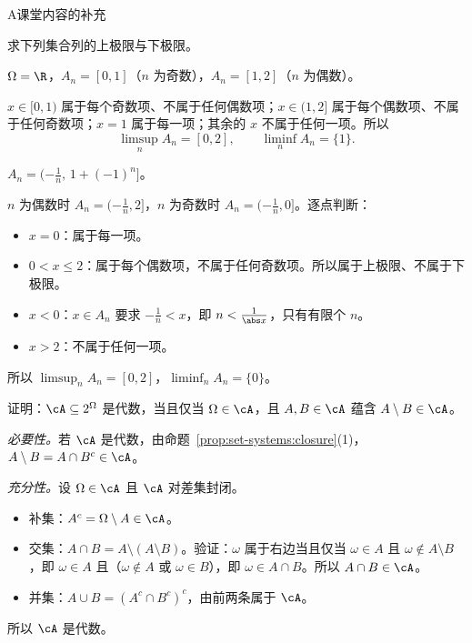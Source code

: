 \begin{exercises}{A}{课堂内容的补充}
\item\label{ex:set-systems:A2} 求下列集合列的上极限与下极限。
\begin{questions}
\item $\Omega=\R$，$A_n=[0,1]$（$n$ 为奇数），$A_n=[1,2]$（$n$ 为偶数）。
\begin{solution}
$x\in[0,1)$ 属于每个奇数项、不属于任何偶数项；$x\in(1,2]$ 属于每个偶数项、不属于任何奇数项；$x=1$ 属于每一项；其余的 $x$ 不属于任何一项。所以
\[
\limsup_nA_n=[0,2],\qquad\liminf_nA_n=\{1\}.
\]
\end{solution}
\item $A_n=(-\frac1n,\,1+(-1)^n]$。
\begin{solution}
$n$ 为偶数时 $A_n=(-\frac1n,2]$，$n$ 为奇数时 $A_n=(-\frac1n,0]$。逐点判断：
\begin{itemize}
\item $x=0$：属于每一项。
\item $0<x\leqslant2$：属于每个偶数项，不属于任何奇数项。所以属于上极限、不属于下极限。
\item $x<0$：$x\in A_n$ 要求 $-\frac1n<x$，即 $n<\frac1{\abs x}$，只有有限个 $n$。
\item $x>2$：不属于任何一项。
\end{itemize}
所以 $\limsup_nA_n=[0,2]$，$\liminf_nA_n=\{0\}$。
\end{solution}
\end{questions}

\item\label{ex:set-systems:A3} 证明：$\cA\subseteq2^\Omega$ 是代数，当且仅当 $\Omega\in\cA$，且 $A,B\in\cA$ 蕴含 $A\setminus B\in\cA$。
\begin{solution}
\emph{必要性。}若 $\cA$ 是代数，由命题~\ref{prop:set-systems:closure}(1)，$A\setminus B=A\cap B^c\in\cA$。

\emph{充分性。}设 $\Omega\in\cA$ 且 $\cA$ 对差集封闭。
\begin{itemize}
\item 补集：$A^c=\Omega\setminus A\in\cA$。
\item 交集：$A\cap B=A\setminus(A\setminus B)$。验证：$\omega$ 属于右边当且仅当 $\omega\in A$ 且 $\omega\notin A\setminus B$，即 $\omega\in A$ 且（$\omega\notin A$ 或 $\omega\in B$），即 $\omega\in A\cap B$。所以 $A\cap B\in\cA$。
\item 并集：$A\cup B=(A^c\cap B^c)^c$，由前两条属于 $\cA$。
\end{itemize}
所以 $\cA$ 是代数。
\end{solution}


\end{exercises}
